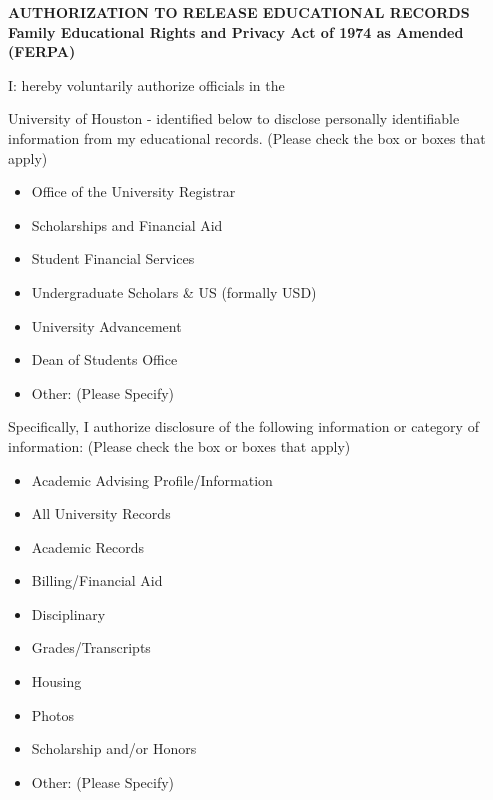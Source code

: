 \documentclass[12pt]{article}
\begin{document}
\begin{center}
\textbf{AUTHORIZATION TO RELEASE EDUCATIONAL RECORDS\\
Family Educational Rights and Privacy Act of 1974 as Amended (FERPA)}
\end{center}

\vspace{1em}
I: \underline{\hspace{6cm}} hereby voluntarily authorize officials in the 

University of Houston - \underline{\hspace{3cm}} identified below to disclose personally identifiable
information from my educational records. (Please check the box or boxes that apply)

\begin{itemize}[leftmargin=0.7cm, label=$\square$]
\item Office of the University Registrar
\item Scholarships and Financial Aid
\item Student Financial Services
\item Undergraduate Scholars \& US (formally USD)
\item University Advancement
\item Dean of Students Office
\item Other: (Please Specify)\underline{\hspace{10cm}}
\end{itemize}

Specifically, I authorize disclosure of the following information or category of information: (Please check the box or
boxes that apply)
\begin{itemize}[leftmargin=0.7cm, label=$\square$]
\item Academic Advising Profile/Information
\item All University Records
\item Academic Records
\item Billing/Financial Aid
\item Disciplinary
\item Grades/Transcripts
\item Housing
\item Photos
\item Scholarship and/or Honors
\item Other: (Please Specify)\underline{\hspace{10cm}}
\end{itemize}
\end{document}
